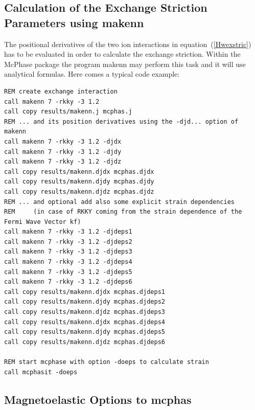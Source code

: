 \subsection{Calculation of the Exchange Striction Parameters using {\prg makenn}}\label{determineExstricpar}

The positional derivatives of the two ion interactions in equation~(\ref{Hwexstric})
has to be evaluated in order to calculate the exchange striction. Within the McPhase 
package the program {\prg makenn}  may perform this task and it will use analytical formulas.
Here comes a typical code example:

\begin{verbatim}
REM create exchange interaction
call makenn 7 -rkky -3 1.2
call copy results/makenn.j mcphas.j
REM ... and its position derivatives using the -djd... option of makenn
call makenn 7 -rkky -3 1.2 -djdx
call makenn 7 -rkky -3 1.2 -djdy
call makenn 7 -rkky -3 1.2 -djdz
call copy results/makenn.djdx mcphas.djdx
call copy results/makenn.djdy mcphas.djdy
call copy results/makenn.djdz mcphas.djdz
REM ... and optional add also some explicit strain dependencies 
REM     (in case of RKKY coming from the strain dependence of the Fermi Wave Vector kf)
call makenn 7 -rkky -3 1.2 -djdeps1
call makenn 7 -rkky -3 1.2 -djdeps2
call makenn 7 -rkky -3 1.2 -djdeps3
call makenn 7 -rkky -3 1.2 -djdeps4
call makenn 7 -rkky -3 1.2 -djdeps5
call makenn 7 -rkky -3 1.2 -djdeps6
call copy results/makenn.djdx mcphas.djdeps1
call copy results/makenn.djdy mcphas.djdeps2
call copy results/makenn.djdz mcphas.djdeps3
call copy results/makenn.djdx mcphas.djdeps4
call copy results/makenn.djdy mcphas.djdeps5
call copy results/makenn.djdz mcphas.djdeps6

REM start mcphase with option -doeps to calculate strain
call mcphasit -doeps 
\end{verbatim}

\subsection{Magnetoelastic Options to {\prg mcphas}}\label{magelastmcphasoptions}

